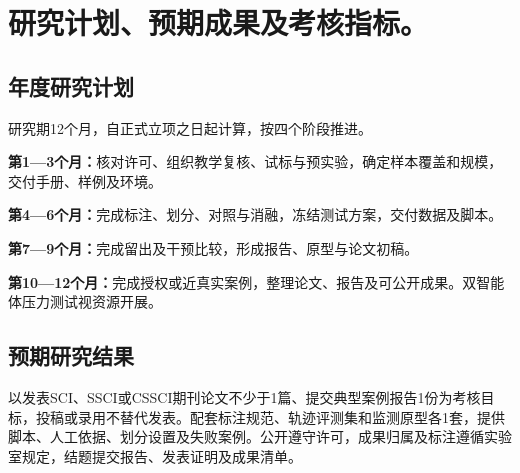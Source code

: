 \section{研究计划、预期成果及考核指标。}
\subsection{年度研究计划}
研究期12个月，自正式立项之日起计算，按四个阶段推进。

\textbf{第1—3个月：}核对许可、组织教学复核、试标与预实验，确定样本覆盖和规模，交付手册、样例及环境。

\textbf{第4—6个月：}完成标注、划分、对照与消融，冻结测试方案，交付数据及脚本。

\textbf{第7—9个月：}完成留出及干预比较，形成报告、原型与论文初稿。

\textbf{第10—12个月：}完成授权或近真实案例，整理论文、报告及可公开成果。双智能体压力测试视资源开展。

\subsection{预期研究结果}
以发表SCI、SSCI或CSSCI期刊论文不少于1篇、提交典型案例报告1份为考核目标，投稿或录用不替代发表。配套标注规范、轨迹评测集和监测原型各1套，提供脚本、人工依据、划分设置及失败案例。公开遵守许可，成果归属及标注遵循实验室规定，结题提交报告、发表证明及成果清单。
